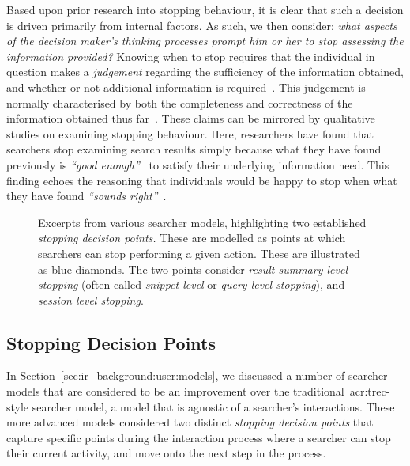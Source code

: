 Based upon prior research into stopping behaviour, it is clear that such a decision is driven primarily from internal factors. As such, we then consider: \emph{what aspects of the decision maker's thinking processes prompt him or her to stop assessing the information provided?} Knowing when to stop requires that the individual in question makes a \emph{judgement} regarding the sufficiency of the information obtained, and whether or not additional information is required~\citep{browne2004stopping_rules}. This judgement is normally characterised by both the completeness and correctness of the information obtained thus far~\citep{smith1991belief}. These claims can be mirrored by qualitative studies on examining stopping behaviour. Here, researchers have found that searchers stop examining search results simply because what they have found previously is \emph{``good enough''}~\citep{zach2005enough_is_enough} to satisfy their underlying information need. This finding echoes the reasoning that individuals would be happy to stop when what they have found \emph{``sounds right''}~\citep{perkins1983difficulties}.

\begin{figure}[t!]
    \centering
    \caption[Two established \emph{stopping decision points}]{Excerpts from various searcher models, highlighting two established \emph{stopping decision points.} These are modelled as points at which searchers can stop performing a given action. These are illustrated as blue diamonds. The two points consider  \emph{result summary level stopping} (often called \emph{snippet level} or \emph{query level stopping}), and  \emph{session level stopping}.}
    \label{fig:model_two_points}
\end{figure}

\subsection{Stopping Decision Points}\label{sec:stopping_background:why:points}
In Section~\ref{sec:ir_background:user:models}, we discussed a number of searcher models that are considered to be an improvement over the traditional~\gls{acr:trec}-style searcher model, a model that is agnostic of a searcher's interactions. These more advanced models considered two distinct \emph{stopping decision points} that capture specific points during the interaction process where a searcher can stop their current activity, and move onto the next step in the process.

